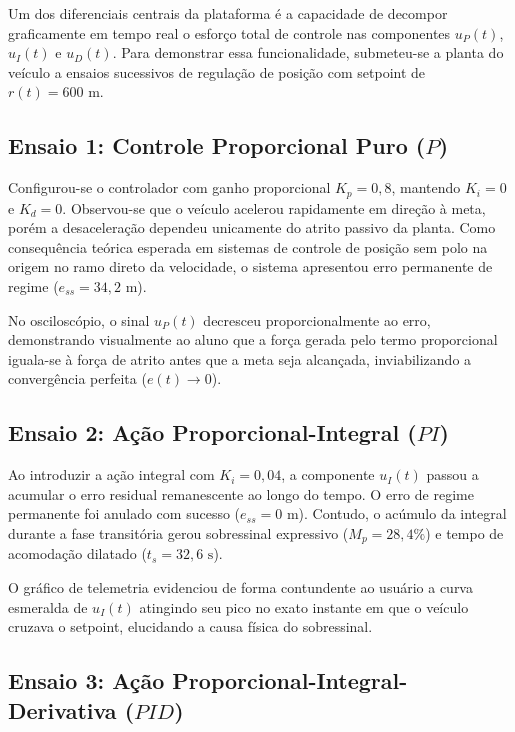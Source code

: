 Um dos diferenciais centrais da plataforma é a capacidade de decompor graficamente em tempo real o esforço total de controle nas componentes $u_P(t)$, $u_I(t)$ e $u_D(t)$. Para demonstrar essa funcionalidade, submeteu-se a planta do veículo a ensaios sucessivos de regulação de posição com setpoint de $r(t) = 600\text{ m}$.

\subsection{Ensaio 1: Controle Proporcional Puro ($P$)}
\label{subsec:ensaio_p}

Configurou-se o controlador com ganho proporcional $K_p = 0{,}8$, mantendo $K_i = 0$ e $K_d = 0$. Observou-se que o veículo acelerou rapidamente em direção à meta, porém a desaceleração dependeu unicamente do atrito passivo da planta. Como consequência teórica esperada em sistemas de controle de posição sem polo na origem no ramo direto da velocidade, o sistema apresentou erro permanente de regime ($e_{ss} = 34{,}2\text{ m}$). 

No osciloscópio, o sinal $u_P(t)$ decresceu proporcionalmente ao erro, demonstrando visualmente ao aluno que a força gerada pelo termo proporcional iguala-se à força de atrito antes que a meta seja alcançada, inviabilizando a convergência perfeita ($e(t) \to 0$).

\subsection{Ensaio 2: Ação Proporcional-Integral ($PI$)}
\label{subsec:ensaio_pi}

Ao introduzir a ação integral com $K_i = 0{,}04$, a componente $u_I(t)$ passou a acumular o erro residual remanescente ao longo do tempo. O erro de regime permanente foi anulado com sucesso ($e_{ss} = 0\text{ m}$). Contudo, o acúmulo da integral durante a fase transitória gerou sobressinal expressivo ($M_p = 28{,}4\%$) e tempo de acomodação dilatado ($t_s = 32{,}6\text{ s}$). 

O gráfico de telemetria evidenciou de forma contundente ao usuário a curva esmeralda de $u_I(t)$ atingindo seu pico no exato instante em que o veículo cruzava o setpoint, elucidando a causa física do sobressinal.

\subsection{Ensaio 3: Ação Proporcional-Integral-Derivativa ($PID$)}
\label{subsec:ensaio_pid}


